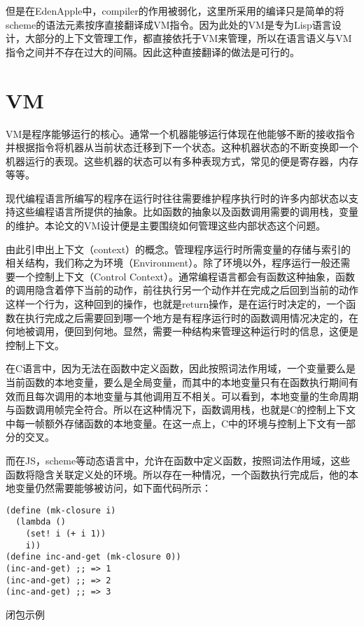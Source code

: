 但是在EdenApple中，compiler的作用被弱化，这里所采用的编译只是简单的将scheme的语法元素按序直接翻译成VM指令。因为此处的VM是专为Lisp语言设计，大部分的上下文管理工作，都直接依托于VM来管理，所以在语言语义与VM指令之间并不存在过大的间隔。因此这种直接翻译的做法是可行的。

\section{VM}

VM是程序能够运行的核心。通常一个机器能够运行体现在他能够不断的接收指令并根据指令将机器从当前状态迁移到下一个状态。这种机器状态的不断变换即一个机器运行的表现。这些机器的状态可以有多种表现方式，常见的便是寄存器，内存等等。

现代编程语言所编写的程序在运行时往往需要维护程序执行时的许多内部状态以支持这些编程语言所提供的抽象。比如函数的抽象以及函数调用需要的调用栈，变量的维护。本论文的VM设计便是主要围绕如何管理这些内部状态这个问题。

由此引申出上下文（context）的概念。管理程序运行时所需变量的存储与索引的相关结构，我们称之为环境（Environment）。除了环境以外，程序运行一般还需要一个控制上下文（Control Context）。通常编程语言都会有函数这种抽象，函数的调用隐含着停下当前的动作，前往执行另一个动作并在完成之后回到当前的动作这样一个行为，这种回到的操作，也就是return操作，是在运行时决定的，一个函数在执行完成之后需要回到哪一个地方是有程序运行时的函数调用情况决定的，在何地被调用，便回到何地。显然，需要一种结构来管理这种运行时的信息，这便是控制上下文。

在C语言中，因为无法在函数中定义函数，因此按照词法作用域，一个变量要么是当前函数的本地变量，要么是全局变量，而其中的本地变量只有在函数执行期间有效而且每次调用的本地变量与其他调用互不相关。可以看到，本地变量的生命周期与函数调用帧完全符合。所以在这种情况下，函数调用栈，也就是C的控制上下文中每一帧额外存储函数的本地变量。在这一点上，C中的环境与控制上下文有一部分的交叉。

而在JS，scheme等动态语言中，允许在函数中定义函数，按照词法作用域，这些函数将隐含关联定义处的环境。所以存在一种情况，一个函数执行完成后，他的本地变量仍然需要能够被访问，如下面代码所示：

\begin{code}
\begin{verbatim}
(define (mk-closure i)
  (lambda ()
    (set! i (+ i 1))
    i))
(define inc-and-get (mk-closure 0))
(inc-and-get) ;; => 1
(inc-and-get) ;; => 2
(inc-and-get) ;; => 3
\end{verbatim}
\caption{闭包示例}
\label{listing:closure-sample}
\end{code}

